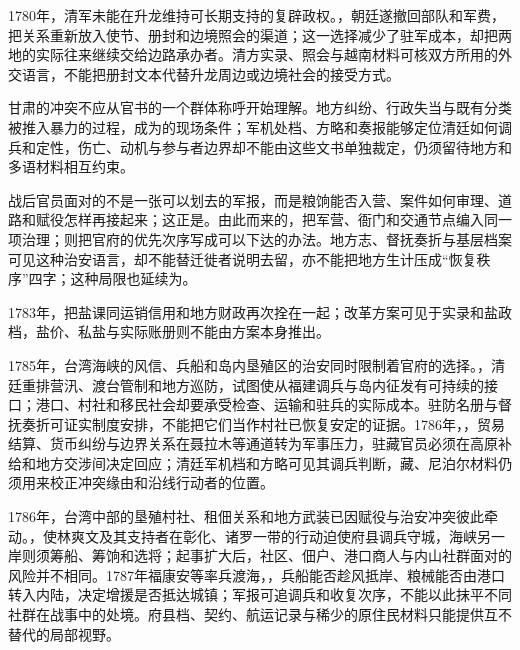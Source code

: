 1780年，清军未能在升龙维持可长期支持的复辟政权。，朝廷遂撤回部队和军费，把关系重新放入使节、册封和边境照会的渠道；这一选择减少了驻军成本，却把两地的实际往来继续交给边路承办者。清方实录、照会与越南材料可核双方所用的外交语言，不能把册封文本代替升龙周边或边境社会的接受方式。

甘肃的冲突不应从官书的一个群体称呼开始理解。地方纠纷、行政失当与既有分类被推入暴力的过程，成为的现场条件；军机处档、方略和奏报能够定位清廷如何调兵和定性，伤亡、动机与参与者边界却不能由这些文书单独裁定，仍须留待地方和多语材料相互约束。

战后官员面对的不是一张可以划去的军报，而是粮饷能否入营、案件如何审理、道路和赋役怎样再接起来；这正是。由此而来的，把军营、衙门和交通节点编入同一项治理；则把官府的优先次序写成可以下达的办法。地方志、督抚奏折与基层档案可见这种治安语言，却不能替迁徙者说明去留，亦不能把地方生计压成“恢复秩序”四字；这种局限也延续为。

1783年，把盐课同运销信用和地方财政再次拴在一起；改革方案可见于实录和盐政档，盐价、私盐与实际账册则不能由方案本身推出。

1785年，台湾海峡的风信、兵船和岛内垦殖区的治安同时限制着官府的选择。，清廷重排营汛、渡台管制和地方巡防，试图使从福建调兵与岛内征发有可持续的接口；港口、村社和移民社会却要承受检查、运输和驻兵的实际成本。驻防名册与督抚奏折可证实制度安排，不能把它们当作村社已恢复安定的证据。1786年，，贸易结算、货币纠纷与边界关系在聂拉木等通道转为军事压力，驻藏官员必须在高原补给和地方交涉间决定回应；清廷军机档和方略可见其调兵判断，藏、尼泊尔材料仍须用来校正冲突缘由和沿线行动者的位置。

1786年，台湾中部的垦殖村社、租佃关系和地方武装已因赋役与治安冲突彼此牵动。，使林爽文及其支持者在彰化、诸罗一带的行动迫使府县调兵守城，海峡另一岸则须筹船、筹饷和选将；起事扩大后，社区、佃户、港口商人与内山社群面对的风险并不相同。1787年福康安等率兵渡海，，兵船能否趁风抵岸、粮械能否由港口转入内陆，决定增援是否抵达城镇；军报可追调兵和收复次序，不能以此抹平不同社群在战事中的处境。府县档、契约、航运记录与稀少的原住民材料只能提供互不替代的局部视野。


